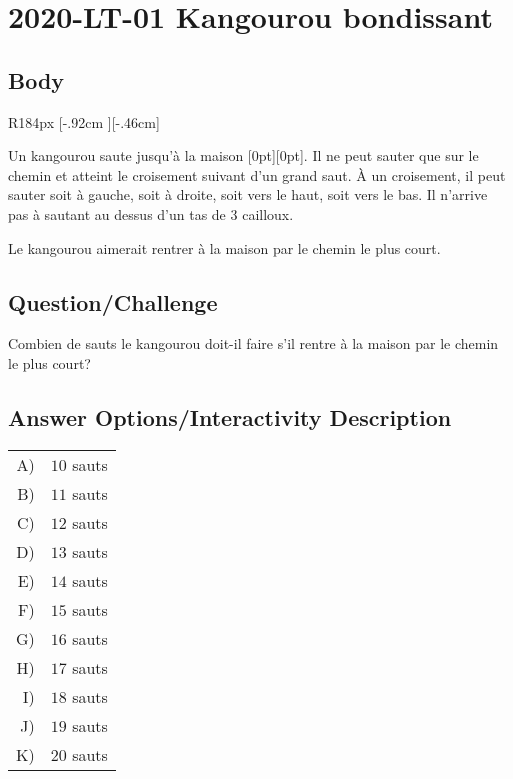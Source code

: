 \documentclass[a4paper,11pt]{report}
\newcommand{\taskGraphicsFolder}{..}
\begin{document}
\section*{\centering{} 2020-LT-01 Kangourou bondissant}


\subsection*{Body}

\begin{wrapfigure}{R}{184px}
\raisebox{-.46cm}[\dimexpr \height-.92cm \relax][-.46cm]{}
\end{wrapfigure}

Un kangourou saute jusqu’à la maison \raisebox{-0.5ex}[0pt][0pt]{}. Il ne peut sauter que sur le chemin et atteint le croisement suivant d’un grand saut. À un croisement, il peut sauter soit à gauche, soit à droite, soit vers le haut, soit vers le bas. Il n’arrive pas à sautant au dessus d’un tas de $3$ cailloux.

Le kangourou aimerait rentrer à la maison par le chemin le plus court.

{\centering%
\par}

{\em

\subsection*{Question/Challenge}

Combien de sauts le kangourou doit-il faire s’il rentre à la maison par le chemin le plus court?

}\begingroup
\renewcommand{\arraystretch}{1.5}
\subsection*{Answer Options/Interactivity Description}

\begin{tabular}{ @{} r l @{} }
  A) & $10$ sauts \\ 
  B) & $11$ sauts \\ 
  C) & $12$ sauts \\ 
  D) & $13$ sauts \\ 
  E) & $14$ sauts \\ 
  F) & $15$ sauts \\ 
  G) & $16$ sauts \\ 
  H) & $17$ sauts \\ 
  I) & $18$ sauts \\ 
  J) & $19$ sauts \\ 
  K) & $20$ sauts
\end{tabular}
\end{document}
